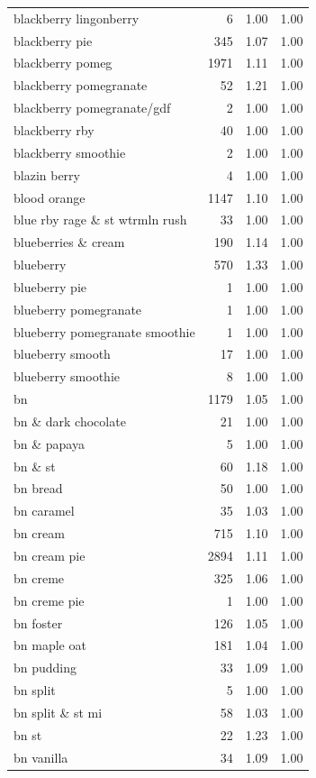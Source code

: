 \begin{table}
\begin{tabular}{lrrr}
blackberry lingonberry & 6 & 1.00 & 1.00 \\
blackberry pie & 345 & 1.07 & 1.00 \\
blackberry pomeg & 1971 & 1.11 & 1.00 \\
blackberry pomegranate & 52 & 1.21 & 1.00 \\
blackberry pomegranate/gdf & 2 & 1.00 & 1.00 \\
blackberry rby & 40 & 1.00 & 1.00 \\
blackberry smoothie & 2 & 1.00 & 1.00 \\
blazin berry & 4 & 1.00 & 1.00 \\
blood orange & 1147 & 1.10 & 1.00 \\
blue rby rage \& st wtrmln rush & 33 & 1.00 & 1.00 \\
blueberries \& cream & 190 & 1.14 & 1.00 \\
blueberry & 570 & 1.33 & 1.00 \\
blueberry pie & 1 & 1.00 & 1.00 \\
blueberry pomegranate & 1 & 1.00 & 1.00 \\
blueberry pomegranate smoothie & 1 & 1.00 & 1.00 \\
blueberry smooth & 17 & 1.00 & 1.00 \\
blueberry smoothie & 8 & 1.00 & 1.00 \\
bn & 1179 & 1.05 & 1.00 \\
bn \& dark chocolate & 21 & 1.00 & 1.00 \\
bn \& papaya & 5 & 1.00 & 1.00 \\
bn \& st & 60 & 1.18 & 1.00 \\
bn bread & 50 & 1.00 & 1.00 \\
bn caramel & 35 & 1.03 & 1.00 \\
bn cream & 715 & 1.10 & 1.00 \\
bn cream pie & 2894 & 1.11 & 1.00 \\
bn creme & 325 & 1.06 & 1.00 \\
bn creme pie & 1 & 1.00 & 1.00 \\
bn foster & 126 & 1.05 & 1.00 \\
bn maple oat & 181 & 1.04 & 1.00 \\
bn pudding & 33 & 1.09 & 1.00 \\
bn split & 5 & 1.00 & 1.00 \\
bn split \& st mi & 58 & 1.03 & 1.00 \\
bn st & 22 & 1.23 & 1.00 \\
bn vanilla & 34 & 1.09 & 1.00 \\

\end{tabular}
\end{table}
